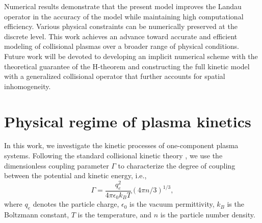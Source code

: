 \documentclass[preprint,1p,times]{elsarticle}
\theoremstyle{definition}
\theoremstyle{remark}
\begin{document}
Numerical results demonstrate that the present model improves the Landau operator in the accuracy of the model while maintaining high computational efficiency. Various physical constraints can be numerically preserved at the discrete level. 
This work achieves an advance toward accurate and efficient modeling of collisional plasmas over a broader range of physical conditions. Future work will be devoted to developing an implicit numerical scheme with the theoretical guarantee of the H-theorem and constructing the full kinetic model with a generalized collisional operator that further accounts for spatial inhomogeneity. 






\appendix
\section{Physical regime of plasma kinetics}\label{sec:physical_regime}

In this work, we investigate the kinetic processes of one-component plasma systems.
Following the standard collisional kinetic theory \cite{hinton1983collisional}, we use the dimensionless coupling parameter $\Gamma$ to characterize the degree of coupling between the potential and kinetic energy, i.e.,  
\begin{equation}
    \Gamma = \dfrac{q_{e}^{2}}{4\pi \epsilon_{0} k_{B} T}(4\pi n/3)^{1/3} ,
\end{equation}
where $q_{e}$ denotes the particle charge, $\epsilon_{0}$ is the vacuum permittivity, $k_{B}$ is the Boltzmann constant, $T$ is the temperature, and $n$ is the particle number density.
\end{document}
